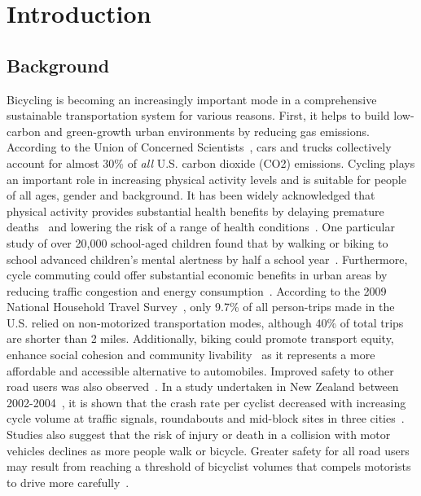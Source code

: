\documentclass [11pt, proquest] {uwthesis}[2015/03/03]
\begin{document}
%
%

%
 
 
 
%
%
%
\textpages
 
 
\chapter {Introduction}
 
\section{Background}
Bicycling is becoming an increasingly important mode in a comprehensive sustainable transportation system for various reasons. First, it helps to build low-carbon and green-growth urban environments by reducing gas emissions. According to the Union of Concerned Scientists~\cite{UCSU14}, cars and trucks collectively account for almost 30\% of \emph{all} U.S. carbon dioxide (CO2) emissions. Cycling plays an important role in increasing physical activity levels and is suitable for people of all ages, gender and background. It has been widely acknowledged that physical activity provides substantial health benefits by delaying premature deaths~\cite{Skerett01} and lowering the risk of a range of health conditions~\cite{Colditz97}. One particular study of over 20,000 school-aged children found that by walking or biking to school advanced children’s mental alertness by half a school year~\cite{SDOT_BMP15}. Furthermore, cycle commuting could offer substantial economic benefits in urban areas by reducing traffic congestion and energy consumption~\cite{Sener09}. According to the 2009 National Household Travel Survey~\cite{NHTS09}, only 9.7\% of all person-trips made in the U.S. relied on non-motorized transportation modes, although 40\% of total trips are shorter than 2 miles. Additionally, biking could promote transport equity, enhance social cohesion and community livability~\cite{Litman07} as it represents a more affordable and accessible alternative to automobiles. Improved safety to other road users was also observed~\cite{Wittink03}. In a study undertaken in New Zealand between 2002-2004~\cite{Turner06}, it is shown that the crash rate per cyclist decreased with increasing cycle volume at traffic signals, roundabouts and mid-block sites in three cities~\cite{Woodward11}. Studies also suggest that the risk of injury or death in a collision with motor vehicles declines as more people walk or bicycle. Greater safety for all road users may result from reaching a threshold of bicyclist volumes that compels motorists to drive more carefully~\cite{SDOT_BMP15}.
\end{document}
